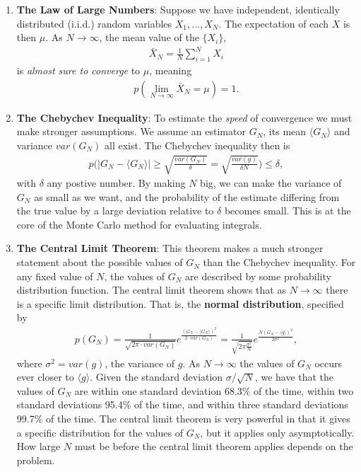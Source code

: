 \documentclass[twoside,english]{uiofysmaster}
\begin{document}
\begin{enumerate}
\item \textbf{The Law of Large Numbers}: Suppose we have independent, identically distributed (i.i.d.) random variables $X_1,...,X_N$. The expectation of each $X$ is then $\mu$. As $N\rightarrow \infty$, the mean value of the $\{ X_i \}$, 
\begin{align}
	\bar{X}_N = \frac{1}{N} \sum_{i=1}^N X_i
\end{align}
is \textit{almost sure to converge} to $\mu$, meaning
\begin{align}
	p(\lim_{N\to \infty} \bar{X}_N = \mu) = 1 .
\end{align}

\item \textbf{The Chebychev Inequality}: To estimate the
  \textit{speed} of convergence we must make stronger assumptions. We
  assume an estimator $G_N$, its mean $\langle G_N \rangle$ and
  variance $var(G_N)$ all exist. The Chebychev inequality then is
\begin{align}
	p\bigg (|G_N - \langle G_N \rangle | \geq \sqrt{\frac{var(G_N)}{\delta}} = \sqrt{\frac{var(g)}{\delta N}} \bigg ) \leq \delta, 
\end{align}
with $\delta$ any postive number. By making $N$ big, we can make the
variance of $G_N$ as small as we want, and the probability of the
estimate differing from the true value by a large deviation relative
to $\delta$ becomes small. This is at the core of the Monte Carlo
method for evaluating integrals.

\item \textbf{The Central Limit Theorem}: This theorem makes a much
  stronger statement about the possible values of $G_N$ than the
  Chebychev inequality. For any fixed value of $N$, the values of
  $G_N$ are described by some probability distribution function. The
  central limit theorem shows that as $N\rightarrow \infty$ there is a
  specific limit distribution. That is, the \textbf{normal distribution}, specified by
\begin{align}
	p(G_N) = \frac{1}{\sqrt{2\pi \cdot var(G_N)}} e^\frac{( G_N - \langle G_N \rangle )^2 }{2 \cdot var(G_N)}
	= \frac{1}{\sqrt{2\pi \frac{\sigma^2}{N} }} e^{\frac{N(G_N - \langle g\rangle)^2}{2\sigma^2}},
\end{align}
where $\sigma^2 = var(g)$, the variance of $g$.  As $N\rightarrow
\infty$ the values of $G_N$ occurs ever closer to $\langle g
\rangle$. Given the standard deviation $\sigma/\sqrt{N}$, we have that
the values of $G_N$ are within one standard deviation 68.3\% of the
time, within two standard deviations 95.4\% of the time, and within
three standard deviations 99.7\% of the time.  The central limit
theorem is very powerful in that it gives a specific distribution for
the values of $G_N$, but it applies only asymptotically. How large $N$
must be before the central limit theorem applies depends on the
problem.

\end{enumerate}
\end{document}
